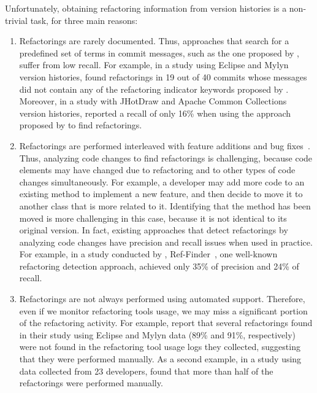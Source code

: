 Unfortunately, obtaining refactoring information from version histories is a non-trivial task, for three main reasons:
\begin{enumerate}
\item Refactorings are rarely documented.
Thus, approaches that search for a predefined set of terms in commit messages, such as the one proposed by \cite{ratzinger2008relation}, suffer from low recall.
For example, in a study using Eclipse and Mylyn version histories,
\cite{MurphyHill2012} found refactorings in 19 out of 40 commits whose messages did not contain any of the refactoring indicator keywords proposed by \cite{ratzinger2008relation}.
Moreover, in a study with JHotDraw and Apache Common Collections version histories, \cite{Soares:2013} reported a recall of only 16\% when using the approach proposed by \cite{ratzinger2008relation} to find refactorings.

\item Refactorings are performed interleaved with feature additions and bug fixes~\citep{MurphyHill2012}.
Thus, analyzing code changes to find refactorings is challenging, because code elements may have changed due to refactoring and to other types of code changes simultaneously.
For example, a developer may add more code to an existing method to implement a new feature, and then decide to move it to another class that is more related to it.
Identifying that the method has been moved is more challenging in this case, because it is not identical to its original version.
In fact, existing approaches that detect refactorings by analyzing code changes have precision and recall issues when used in practice.
For example, in a study conducted by \cite{Soares:2013}, Ref-Finder~\citep{prete2010template,Kim:2010:RefFinder}, one well-known refactoring detection approach, achieved only 35\% of precision and 24\% of recall.

\item Refactorings are not always performed using automated support.
Therefore, even if we monitor refactoring tools usage, we may miss a significant portion of the refactoring activity.
For example, \cite{MurphyHill2012} report that several refactorings found in their study using Eclipse and Mylyn data (89\% and 91\%, respectively) were not found in the refactoring tool usage logs they collected, suggesting that they were performed manually.
As a second example, in a study using data collected from 23 developers, \cite{negara2013} found that more than half of the refactorings were performed manually.
\end{enumerate}

